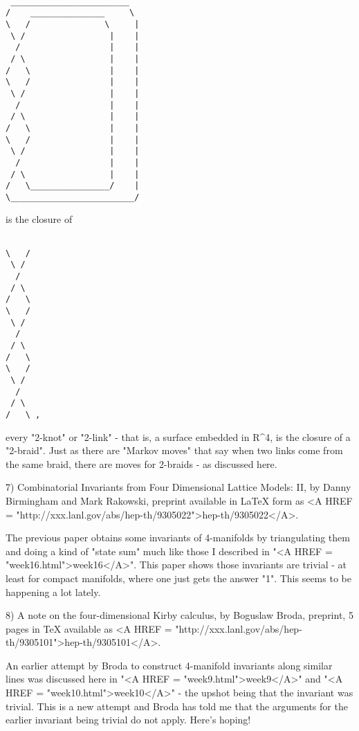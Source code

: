 \begin{verbatim}

 ________________________
/    _______________     \ 
\   /               \     |
 \ /                 |    |
  /                  |    |    
 / \                 |    |
/   \                |    |
\   /                |    |
 \ /                 |    |
  /                  |    |    
 / \                 |    |
/   \                |    |
\   /                |    |
 \ /                 |    |
  /                  |    |    
 / \                 |    |
/   \________________/    |
\_________________________/
\end{verbatim}
    

is the closure of


\begin{verbatim}

\   /       
 \ /        
  /         
 / \        
/   \       
\   /       
 \ /        
  /         
 / \        
/   \       
\   /       
 \ /        
  /         
 / \        
/   \ ,
\end{verbatim}
    

every "2-knot" or "2-link" - that is, a surface embedded in R^4, is the
closure of a "2-braid".  Just as there are "Markov moves" that say when
two links come from the same braid, there are moves for 2-braids - as
discussed here.

7) Combinatorial Invariants from Four Dimensional Lattice Models: II, by
Danny Birmingham and Mark Rakowski, preprint available in LaTeX form as
<A HREF = "http://xxx.lanl.gov/abs/hep-th/9305022">hep-th/9305022</A>.

The previous paper obtains some invariants of 4-manifolds by
triangulating them and doing a kind of "state sum" much like those I
described in "<A HREF = "week16.html">week16</A>".  This paper shows those invariants are trivial -
at least for compact manifolds, where one just gets the answer "1".
This seems to be happening a lot lately.

8)  A note on the four-dimensional Kirby calculus, by Boguslaw Broda,
preprint, 5 pages in TeX available as <A HREF = "http://xxx.lanl.gov/abs/hep-th/9305101">hep-th/9305101</A>.

An earlier attempt by Broda to construct 4-manifold invariants along
similar lines was discussed here in "<A HREF = "week9.html">week9</A>" and "<A HREF = "week10.html">week10</A>" - the upshot
being that the invariant was trivial.  This is a new attempt and Broda
has told me that the arguments for the earlier invariant being trivial
do not apply.  Here's hoping!


